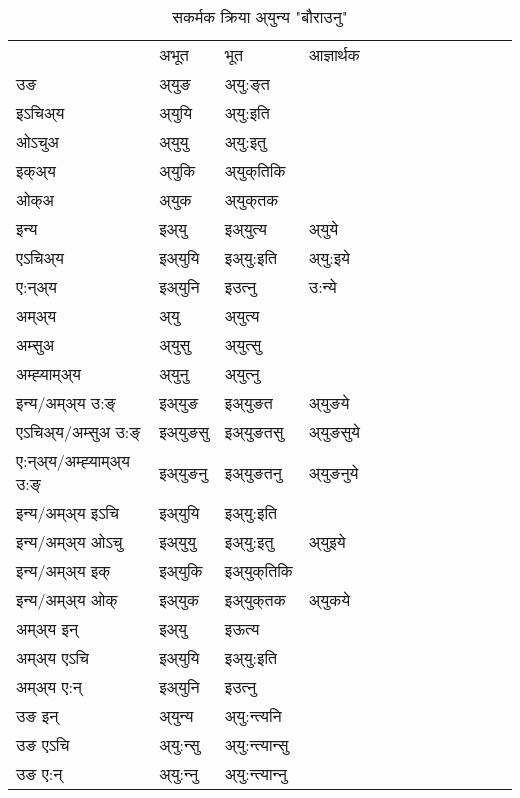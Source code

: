 \begin{table}[H]
\centering
\caption{\label{u.vt} सकर्मक क्रिया  अ्युन्य  "बौराउनु"  }
\begin{tabular}{l|l|l|l|l|l|l|l|l|l|l|l|l}  \toprule
&अभूत & भूत & आज्ञार्थक \\ 
उङ &अ्युङ &अ्यु:ङ्‌त \\ 
इऽचिअ्य &अ्युयि &अ्यु:इति   \\ 
ओऽचुअ &अ्युयु &अ्यु:इतु   \\ 
इक्अ्य &अ्युकि &अ्युक्‌तिकि   \\ 
ओक्अ &अ्युक &अ्युक्‌तक   \\ 
इन्य & इअ्यु & इअ्युत्य &अ्युये  \\ 
एऽचिअ्य & इअ्युयि & इअ्यु:इति &अ्यु:इये    \\ 
ए:न्अ्य & इअ्युनि  & इउत्‍नु &उ:न्ये  \\ 
अम्अ्य & अ्यु & अ्युत्य   \\ 
अम्सुअ & अ्युसु & अ्युत्सु     \\ 
अम्ह्‍याम्अ्य & अ्युनु  & अ्युत्‍नु \\ 
\midrule
इन्य/अम्अ्य उ:ङ्‌&इअ्युङ &इअ्युङत &अ्युङये \\ 
एऽचिअ्य/अम्सुअ उ:ङ्‌ &इअ्युङसु &इअ्युङतसु &अ्युङसुये \\ 
ए:न्अ्य/अम्ह्‍याम्अ्य उ:ङ्‌ &इअ्युङनु &इअ्युङतनु &अ्युङनुये \\ 
इन्य/अम्अ्य इऽचि &इअ्युयि &इअ्यु:इति    \\ 
इन्य/अम्अ्य ओऽचु &इअ्युयु &इअ्यु:इतु  &अ्युइये  \\ 
इन्य/अम्अ्य इक् &इअ्युकि &इअ्युक्‌तिकि   \\ 
इन्य/अम्अ्य ओक् &इअ्युक &इअ्युक्‌तक  &अ्युकये  \\ 
अम्अ्य इन् & इअ्यु & इऊत्य   \\ 
अम्अ्य एऽचि & इअ्युयि & इअ्यु:इति     \\ 
अम्अ्य ए:न् & इअ्युनि  & इउत्‍नु  \\ 
\midrule
उङ इन् & अ्युन्य  & अ्यु:न्त्यनि  \\ 
उङ एऽचि & अ्यु:न्सु  & अ्यु:न्त्यान्सु   \\ 
उङ ए:न्& अ्यु:न्‍नु  & अ्यु:न्त्यान्‍नु   \\ 
\bottomrule
\end{tabular}
\end{table}


